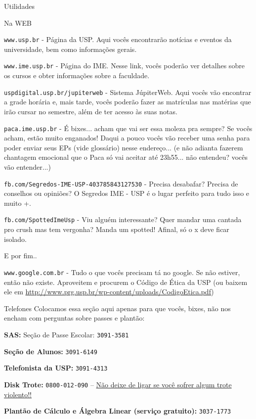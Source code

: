 \begin{secao}{Utilidades}

\begin{subsecao}{Na WEB}

{\tt www.usp.br} - Página da USP. Aqui vocês encontrarão notícias e eventos da
universidade, bem como informações gerais.

{\tt www.ime.usp.br} - Página do IME.
Nesse link, vocês poderão ver detalhes sobre os cursos e obter informações sobre
a faculdade.

{\tt uspdigital.usp.br/jupiterweb} - Sistema JúpiterWeb. Aqui vocês vão
encontrar a grade horária e, mais tarde, vocês poderão fazer as matrículas nas
matérias que irão cursar no semestre, além de ter acesso às suas notas.

{\tt paca.ime.usp.br} - É bixes... acham que vai ser essa moleza pra sempre? Se
vocês acham, estão muito enganados! Daqui a pouco vocês vão receber uma senha para
poder enviar seus EPs (vide glossário) nesse endereço... (e não adianta fazerem
chantagem emocional que o Paca só vai aceitar até 23h55... não entendeu? vocês
vão entender...)

{\tt fb.com/Segredos-IME-USP-403785843127530} - Precisa desabafar? 
Precisa de conselhos ou opiniões? O Segredos IME - USP é o lugar perfeito para 
tudo isso e muito +.


{\tt fb.com/SpottedImeUsp} - Viu alguém interessante? Quer mandar uma cantada 
pro crush mas tem vergonha? Manda um spotted! Afinal, só o x deve ficar isolado.


E por fim..

{\tt www.google.com.br} - Tudo o que vocês precisam tá no google. Se não estiver,
então não existe. Aproveitem e procurem o Código de Ética da USP (ou baixem ele em
\url{http://www.prg.usp.br/wp-content/uploads/CodigoEtica.pdf})

\end{subsecao}

\begin{subsecao}{Telefones}
Colocamos essa seção aqui apenas para que vocês, bixes, não nos encham com perguntas
sobre passes e plantão:

{\bf SAS:} Seção de Passe Escolar: {\tt 3091-3581}

{\bf Seção de Alunos:} {\tt 3091-6149}

{\bf Telefonista da USP:} {\tt 3091-4313}

{\bf Disk Trote:} {\tt 0800-012-090} -- \underline{Não deixe de ligar se você sofrer algum trote violento!!}

{\bf Plantão de Cálculo e Álgebra Linear (serviço gratuito):} {\tt 3037-1773}

\end{subsecao}
\end{secao}
